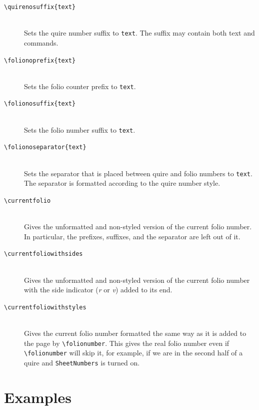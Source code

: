 \documentclass[a4paper, 12pt]{article}
\newcommand{\feature}[1]{\texttt{#1}}
\newcommand{\command}[1]{\texttt{\textbackslash{}#1}}
\newcommand{\commandone}[2]{\texttt{\textbackslash{}#1\{#2\}}}
\newcommand{\argument}[1]{\texttt{#1}}
\begin{document}
\begin{description}
\item [\commandone{quirenosuffix}{text}] \mbox{} \\
  Sets the quire number suffix to \argument{text}. The suffix may
  contain both text and commands.

\item [\commandone{folionoprefix}{text}] \mbox{} \\
  Sets the folio counter prefix to \argument{text}. 

\item [\commandone{folionosuffix}{text}] \mbox{} \\
  Sets the folio number suffix to \argument{text}. 

\item [\commandone{folionoseparator}{text}] \mbox{} \\
  Sets the separator that is placed between quire and folio numbers to
  \argument{text}. The separator is formatted according to the quire
  number style. 

\item [\command{currentfolio}] \mbox{} \\
  Gives the unformatted and non-styled version of the current folio
  number. In particular, the prefixes, suffixes, and the separator are
  left out of it.

\item [\command{currentfoliowithsides}] \mbox{} \\
  Gives the unformatted and non-styled version of the current folio
  number with the side indicator (\emph{r} or \emph{v}) added to its
  end.

\item [\command{currentfoliowithstyles}] \mbox{} \\
  Gives the current folio number formatted the same way as it is added
  to the page by \command{folionumber}. This gives the real folio
  number even if \command{folionumber} will skip it, for example, if
  we are in the second half of a quire and \feature{SheetNumbers} is
  turned on.


\end{description}

\section{Examples}
\end{document}
